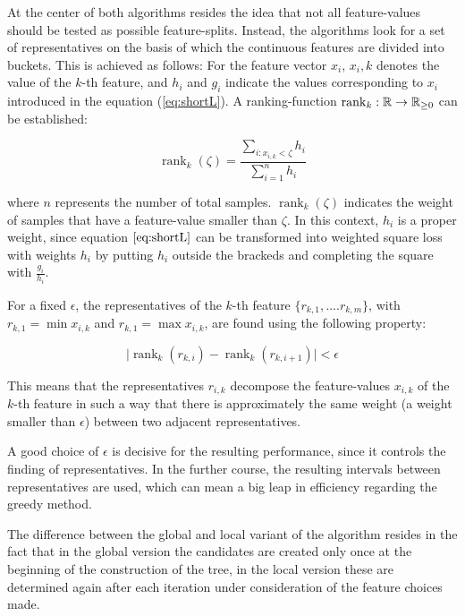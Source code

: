 \newcommand{\rnk}{\operatorname{rank}}
At the center of both algorithms resides the idea that not all feature-values should be tested as possible feature-splits. Instead, the algorithms look for a set of representatives on the basis of which the continuous features are divided into buckets. This is achieved as follows: For the feature vector $x_i$, $x_i,k$ denotes the value of the $k$-th feature, and $h_i$ and $g_i$ indicate the values corresponding to $x_i$ introduced in the equation (\ref{eq:shortL}).
A ranking-function $\rnk_k : \R\to \R_{\geq 0}$ can be established:

\begin{equation} \label{eq:ranking}
	\rnk_k(\zeta) = \frac{\sum\limits_{i: x_{i,k} < \zeta} h_i}{\sum\limits_{i=1}^n h_i}
\end{equation}

where $n$ represents the number of total samples. $\rnk_k(\zeta)$ indicates the weight of samples that have a feature-value smaller than $\zeta$. In this context, $h_i$ is a proper weight, since equation $\ref{eq:shortL}$ can be transformed into weighted square loss with weights $h_i$ by putting $h_i$ outside the brackeds and completing the square with $\frac{g_i}{h_i}$.

For a fixed $\epsilon$, the representatives of the $k$-th feature $\{r_{k,1}, ... .r_{k,m}\}$, with $r_{k,1} = \min x_{i,k}$ and $r_{k,1} = \max x_{i,k}$, are found using the following property:

\begin{equation}
	\mid \rnk_k(r_{k,i}) - \rnk_k(r_{k,i+1}) \mid < \epsilon
\end{equation}

This means that the representatives $r_{i,k}$ decompose the feature-values $x_{i,k}$ of the $k$-th feature in such a way that there is approximately the same weight (a weight smaller than $\epsilon$) between two adjacent representatives.

A good choice of $\epsilon$ is decisive for the resulting performance, since it controls the finding of representatives. In the further course, the resulting intervals between representatives are used, which can mean a big leap in efficiency regarding the greedy method.

The difference between the global and local variant of the algorithm resides in the fact that in the global version the candidates are created only once at the beginning of the construction of the tree, in the local version these are determined again after each iteration under consideration of the feature choices made.

